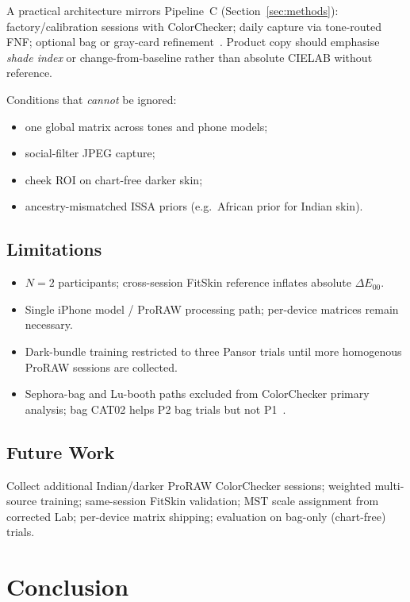 \documentclass[11pt]{article}
\newcommand{\deee}{\ensuremath{\Delta E_{00}}}
\begin{document}
A practical architecture mirrors Pipeline~C (Section~\ref{sec:methods}): factory/calibration sessions with ColorChecker; daily capture via tone-routed FNF; optional bag or gray-card refinement~\cite{fitskin2026pansor}.
Product copy should emphasise \emph{shade index} or change-from-baseline rather than absolute CIELAB without reference.

Conditions that \emph{cannot} be ignored:
\begin{itemize}[noitemsep]
  \item one global matrix across tones and phone models;
  \item social-filter JPEG capture;
  \item cheek ROI on chart-free darker skin;
  \item ancestry-mismatched ISSA priors (e.g.\ African prior for Indian skin).
\end{itemize}

\subsection{Limitations}

\begin{itemize}[noitemsep]
  \item $N=2$ participants; cross-session FitSkin reference inflates absolute $\deee$.
  \item Single iPhone model / ProRAW processing path; per-device matrices remain necessary.
  \item Dark-bundle training restricted to three Pansor trials until more homogenous ProRAW sessions are collected.
  \item Sephora-bag and Lu-booth paths excluded from ColorChecker primary analysis; bag CAT02 helps P2 bag trials but not P1~\cite{fitskin2026pansor}.
\end{itemize}

\subsection{Future Work}

Collect additional Indian/darker ProRAW ColorChecker sessions; weighted multi-source training; same-session FitSkin validation; MST scale assignment from corrected Lab; per-device matrix shipping; evaluation on bag-only (chart-free) trials.

\section{Conclusion}\label{sec:conclusion}
\end{document}
